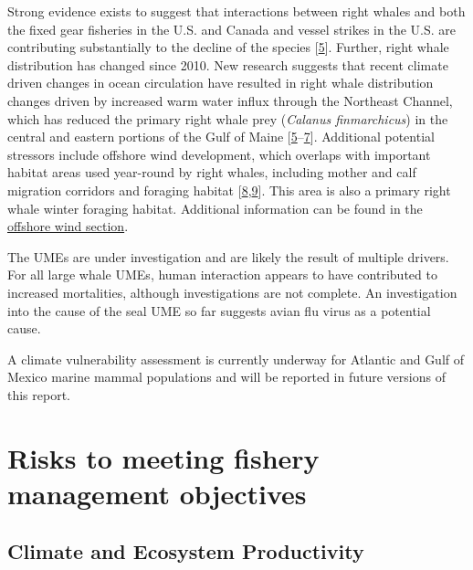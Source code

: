 \documentclass[
  10pt,
]{article}
\begin{document}
Strong evidence exists to suggest that interactions between right whales and both the fixed gear fisheries in the U.S. and Canada and vessel strikes in the U.S. are contributing substantially to the decline of the species {[}\protect\hyperlink{ref-hayes_north_2018}{5}{]}. Further, right whale distribution has changed since 2010. New research suggests that recent climate driven changes in ocean circulation have resulted in right whale distribution changes driven by increased warm water influx through the Northeast Channel, which has reduced the primary right whale prey (\emph{Calanus finmarchicus}) in the central and eastern portions of the Gulf of Maine {[}\protect\hyperlink{ref-hayes_north_2018}{5}--\protect\hyperlink{ref-sorochan_north_2019}{7}{]}. Additional potential stressors include offshore wind development, which overlaps with important habitat areas used year-round by right whales, including mother and calf migration corridors and foraging habitat {[}\protect\hyperlink{ref-quintana-rizzo_narw_wind_2021}{8},\protect\hyperlink{ref-schick_whale_2009}{9}{]}. This area is also a primary right whale winter foraging habitat. Additional information can be found in the \protect\hyperlink{other-ocean-uses:-offshore-wind}{offshore wind section}.

The UMEs are under investigation and are likely the result of multiple drivers. For all large whale UMEs, human interaction appears to have contributed to increased mortalities, although investigations are not complete. An investigation into the cause of the seal UME so far suggests avian flu virus as a potential cause.

A climate vulnerability assessment is currently underway for Atlantic and Gulf of Mexico marine mammal populations and will be reported in future versions of this report.

\newpage

\hypertarget{risks-to-meeting-fishery-management-objectives}{%
\section{Risks to meeting fishery management objectives}\label{risks-to-meeting-fishery-management-objectives}}

\hypertarget{climate-and-ecosystem-productivity}{%
\subsection{Climate and Ecosystem Productivity}\label{climate-and-ecosystem-productivity}}
\end{document}

